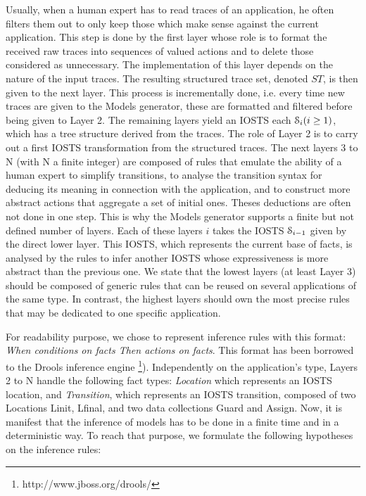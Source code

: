 Usually, when a human expert has to read traces of an
application, he often filters them out to only keep those which
make sense against the current application. This step is done by
the first layer whose role is to format the received raw traces
into sequences of valued actions and to delete those considered
as unnecessary. The implementation of this layer depends on the
nature of the input traces. The resulting structured trace set,
denoted $ST$, is then given to the next layer. This process is
incrementally done, i.e. every time new traces are given to the
Models generator, these are formatted and filtered before being
given to Layer 2. The remaining layers yield an IOSTS each
$\EuScript{S}_i (i\geq 1)$, which has a tree structure derived
from the traces. The role of Layer 2 is to carry out a first
IOSTS transformation from the structured traces. The next layers
3 to N (with N a finite integer) are composed of rules that
emulate the ability of a human expert to simplify transitions, to
analyse the transition syntax for deducing its meaning in
connection with the application, and to construct more abstract
actions that aggregate a set of initial ones. Theses deductions
are often not done in one step. This is why the Models generator
supports a finite but not defined number of layers.  Each of
these layers $i$ takes the IOSTS $\EuScript{S}_{i-1}$ given by
the direct lower layer. This IOSTS, which represents the current
base of facts, is analysed by the rules to infer another IOSTS
whose expressiveness is more abstract than the previous one. We
state that the lowest layers (at least Layer 3) should be
composed of generic rules that can be reused on several
applications of the same type. In contrast, the highest layers
should own the most precise rules that may be dedicated to one
specific application.

For readability purpose, we chose to represent inference rules
with this format: \emph{When conditions on facts Then actions on
facts}. This format has been borrowed to the Drools inference
engine \footnote{http://www.jboss.org/drools/}). Independently
on the application's type, Layers 2 to N handle the following
fact types: \emph{Location} which represents an IOSTS location,
and \emph{Transition}, which represents an IOSTS transition,
composed of two Locations Linit, Lfinal, and two data collections
Guard and Assign. Now, it is manifest that the inference of
models has to be done in a finite time and in a deterministic
way. To reach that purpose, we formulate the following hypotheses
on the inference rules:

